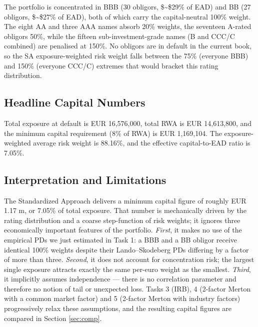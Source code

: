 \documentclass[
  11pt,
]{article}
\newenvironment{Shaded}{\begin{snugshade}}{\end{snugshade}}
\newcommand{\FloatTok}[1]{\textcolor[rgb]{0.00,0.00,0.81}{#1}}
\newcommand{\FunctionTok}[1]{\textcolor[rgb]{0.13,0.29,0.53}{\textbf{#1}}}
\newcommand{\NormalTok}[1]{#1}
\newcommand{\OtherTok}[1]{\textcolor[rgb]{0.56,0.35,0.01}{#1}}
\newcommand{\SpecialCharTok}[1]{\textcolor[rgb]{0.81,0.36,0.00}{\textbf{#1}}}
\begin{document}
The portfolio is concentrated in BBB (30 obligors, \$\sim\$29\% of EAD)
and BB (27 obligors, \$\sim\$27\% of EAD), both of which carry the
capital-neutral 100\% weight. The eight AA and three AAA names absorb
20\% weights, the seventeen A-rated obligors 50\%, while the fifteen
sub-investment-grade names (B and CCC/C combined) are penalised at
150\%. No obligors are in default in the current book, so the SA
exposure-weighted risk weight falls between the 75\% (everyone BBB) and
150\% (everyone CCC/C) extremes that would bracket this rating
distribution.

\subsection{Headline Capital Numbers}\label{headline-capital-numbers}

\begin{Shaded}
\end{Shaded}

Total exposure at default is EUR 16,576,000, total RWA is EUR
14,613,800, and the minimum capital requirement (8\% of RWA) is EUR
1,169,104. The exposure-weighted average risk weight is 88.16\%, and the
effective capital-to-EAD ratio is 7.05\%.

\subsection{Interpretation and
Limitations}\label{interpretation-and-limitations}

The Standardized Approach delivers a minimum capital figure of roughly
EUR 1.17 m, or 7.05\% of total exposure. That number is mechanically
driven by the rating distribution and a coarse step-function of risk
weights; it ignores three economically important features of the
portfolio. \emph{First}, it makes no use of the empirical PDs we just
estimated in Task 1: a BBB and a BB obligor receive identical 100\%
weights despite their Lando--Skodeberg PDs differing by a factor of more
than three. \emph{Second}, it does not account for concentration risk;
the largest single exposure attracts exactly the same per-euro weight as
the smallest. \emph{Third}, it implicitly assumes independence --- there
is no correlation parameter and therefore no notion of tail or
unexpected loss. Tasks 3 (IRB), 4 (2-factor Merton with a common market
factor) and 5 (2-factor Merton with industry factors) progressively
relax these assumptions, and the resulting capital figures are compared
in Section \ref{sec:comp}.
\end{document}
